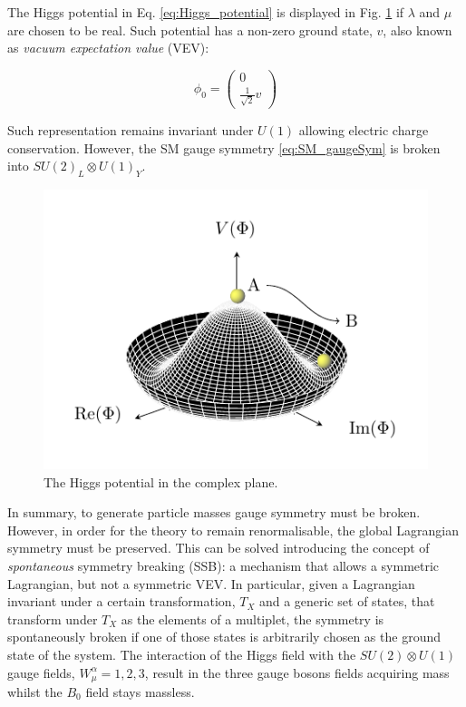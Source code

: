 			The Higgs potential in Eq. \ref{eq:Higgs_potential} is displayed in Fig. \ref{fig:higgs_potential} if $\lambda$ and $\mu$ are chosen to be real. Such potential has a non-zero ground state, $v$, also known as \emph{vacuum expectation value} (VEV):

			\begin{equation}
			\label{eq:Higgs_vev}
				\phi_0 = 
				\begin{pmatrix}
					0 \\ \frac{1}{\sqrt{2}} v
				\end{pmatrix}
			\end{equation}

			\noindent Such representation remains invariant under $U(1)$ allowing electric charge conservation. However, the SM gauge symmetry \ref{eq:SM_gaugeSym} is broken into $SU(2)_L \otimes U(1)_Y$.

			\begin{figure}
			\centering
				\includegraphics[width=.5\textwidth]{HiggsPotential/HiggsPotential}
			\caption{\label{fig:higgs_potential} The Higgs potential in the complex plane.} %
			\end{figure}

			In summary, to generate particle masses gauge symmetry must be broken. However, in order for the theory to remain renormalisable, the global Lagrangian symmetry must be preserved. This can be solved introducing the concept of \emph{spontaneous} symmetry breaking (SSB): a mechanism that allows a symmetric Lagrangian, but not a symmetric VEV. In particular, given a Lagrangian invariant under a certain transformation, $T_X$ and a generic set of states, that transform under $T_X$ as the elements of a multiplet, the symmetry is spontaneously broken if one of those states is arbitrarily chosen as the ground state of the system. 
			The interaction of the Higgs field with the $SU(2) \otimes U(1)$ gauge fields, $W_\mu^\alpha =1,2,3$, result in the three gauge bosons fields acquiring mass whilst the $B_0$ field stays massless. 





